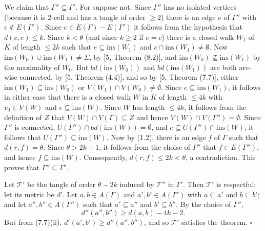 We claim that $\Gamma'' \subseteq \Gamma'$. For suppose not. Since $\Gamma''$ has no isolated vertices (because it is 2-cell and has a tangle of order $\ge 2$) there is an edge $e$ of $\Gamma''$ with $e \notin E(\Gamma')$. Since $e \in E(\Gamma) - E(\Gamma')$ it follows from the hypothesis that $d(c, e) \le k$. Since $k < \theta$ (and since $k \ge 2$ if $e = c$) there is a closed walk $W_1$ of $K$ of length $\le 2k$ such that $e \subseteq \text{ins}(W_1)$ and $c \cap \text{ins}(W_1) \ne \emptyset$. Now $\text{ins}(W_0) \cup \text{ins}(W_1) \ne \Sigma$, by [5, Theorem (8.2)], and $\text{ins}(W_0) \nsubseteq \text{ins}(W_1)$ by the maximality of $W_0$. But $bd(\text{ins}(W_0))$ and $bd(\text{ins}(W_1))$ are both arc-wise connected, by [5, Theorem (4.4)], and so by [5, Theorem (7.7)], either $\text{ins}(W_1) \subseteq \text{ins}(W_0)$ or $V(W_1) \cap V(W_0) \ne \emptyset$. Since $e \subseteq \text{ins}(W_1)$, it follows in either case that there is a closed walk $W$ in $K$ of length $\le 4k$ with $v_0 \in V(W)$ and $e \subseteq \text{ins}(W)$. Since $W$ has length $\le 4k$, it follows from the definition of $Z$ that $V(W) \cap V(\Gamma) \subseteq Z$ and hence $V(W) \cap V(\Gamma'') = \emptyset$. Since $\Gamma''$ is connected, $U(\Gamma'') \cap bd(\text{ins}(W)) = \emptyset$, and $e \subseteq U(\Gamma'') \cap \text{ins}(W)$, it follows that $U(\Gamma'') \subseteq \text{ins}(W)$. Now by (1.2), there is an edge $f$ of $\Gamma$ such that $d(r, f) = \theta$. Since $\theta > 2k + 1$, it follows from the choise of $\Gamma''$ that $f \in E(\Gamma'')$, and hence $f \subseteq \text{ins}(W)$. Consequently, $d(r, f) \le 2k < \theta$, a contradiction. This proves that $\Gamma'' \subseteq \Gamma'$.

Let $\mathscr{T}'$ be the tangle of order $\theta - 2k$ induced by $\mathscr{T}''$ in $\Gamma'$. Then $\mathscr{T}'$ is respectful; let its metric be $d'$. Let $a, b \in A(\Gamma)$ and $a', b' \in A(\Gamma')$ with $a \subseteq a'$ and $b \subseteq b'$; and let $a'', b'' \in A(\Gamma'')$ such that $a' \subseteq a''$ and $b' \subseteq b''$. By the choice of $\Gamma''$,
\begin{equation*}
d''(a'', b'') \ge d(a, b) - 4k - 2.
\end{equation*}
But from (7.7)(ii), $d'(a', b') \ge d''(a'', b'')$, and so $\mathscr{T}'$ satisfies the theorem. $\square$
